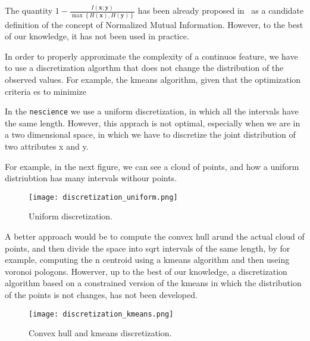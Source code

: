 The quantity $1 - \frac{I\left(\mathbf{x};\mathbf{y}\right)}{\max\left\{ H\left(\mathbf{x}\right),H\left(\mathbf{y}\right)\right\} }$ has been already proposed in~\cite{ferri2009experimental} as a candidate definition of the concept of Normalized Mutual Information. However, to the best of our knowledge, it has not been used in practice.

\begin{example}
    
\end{example}

\begin{remark}
    
In order to properly approximate the complexity of a continuos feature, we have to use a discretization algorthm that does not change the distribution of the observed values. For example, the kmeans algorithm, given that the optimization criteria es to minimize 


In the \texttt{nescience} we use a uniform discretization, in which all the intervals have the same length. However, this apprach is not optimal, especially when we are in a two dimensional space, in which we have to discretize the joint distribution of two attributes x and y. 

For example, in the next figure, we can see a cloud of points, and how a uniform distriubtion has many intervals withour points.

\begin{figure}[ht]
    \centering
    \texttt{[image: discretization\_uniform.png]}
    \caption{Uniform discretization.}
    \label{figure:discretization_uniform}
\end{figure}

A better approach would be to compute the convex hull arund the actual cloud of points, and then divide the space into sqrt intervals of the same length, by for example, computing the n centroid using a kmeans algorithm and then useing voronoi pologons. Howerver, up to the best of our knowledge, a discretization algorithm based on a constrained version of the kmeans in which the distribution of the points is not changes, has not been developed.

\begin{figure}[ht]
    \centering
    \texttt{[image: discretization\_kmeans.png]}
    \caption{Convex hull and kmeans discretization.}
    \label{figure:discretization_kmeans}
\end{figure}


\end{remark}


